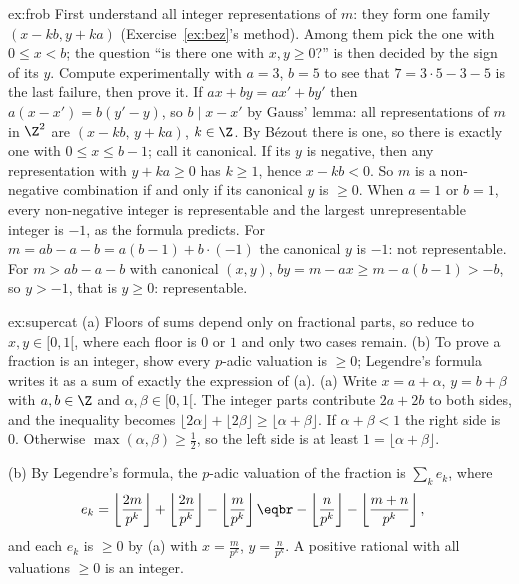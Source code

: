 \begin{solution}{ex:frob}
\idea First understand all integer representations of $m$: they form one family $(x-kb,y+ka)$ (Exercise~\ref{ex:bez}'s method). Among them pick the one with $0\le x<b$; the question ``is there one with $x,y\ge0$?'' is then decided by the sign of its $y$. Compute experimentally with $a=3$, $b=5$ to see that $7=3\cdot5-3-5$ is the last failure, then prove it.
\writeup If $ax+by=ax'+by'$ then $a(x-x')=b(y'-y)$, so $b\mid x-x'$ by Gauss' lemma: all representations of $m$ in $\Z^2$ are $(x-kb,\,y+ka)$, $k\in\Z$. By B\'ezout there is one, so there is exactly one with $0\le x\le b-1$; call it canonical.
If its $y$ is negative, then any representation with $y+ka\ge0$ has $k\ge1$, hence $x-kb<0$. So $m$ is a non-negative combination if and only if its canonical $y$ is $\ge0$.
When $a=1$ or $b=1$, every non-negative integer is representable and the largest unrepresentable integer is $-1$, as the formula predicts. For $m=ab-a-b=a(b-1)+b\cdot(-1)$ the canonical $y$ is $-1$: not representable. For $m>ab-a-b$ with canonical $(x,y)$, $by=m-ax\ge m-a(b-1)>-b$, so $y>-1$, that is $y\ge0$: representable.
\end{solution}

\begin{solution}{ex:supercat}
\idea (a) Floors of sums depend only on fractional parts, so reduce to $x,y\in[0,1[$, where each floor is $0$ or $1$ and only two cases remain. (b) To prove a fraction is an integer, show every $p$-adic valuation is $\ge0$; Legendre's formula writes it as a sum of exactly the expression of (a).
\writeup (a) Write $x=a+\alpha$, $y=b+\beta$ with $a,b\in\Z$ and $\alpha,\beta\in[0,1[$. The integer parts contribute $2a+2b$ to both sides, and the inequality becomes $\lfloor2\alpha\rfloor+\lfloor2\beta\rfloor\ge\lfloor\alpha+\beta\rfloor$. If $\alpha+\beta<1$ the right side is $0$. Otherwise $\max(\alpha,\beta)\ge\frac12$, so the left side is at least $1=\lfloor\alpha+\beta\rfloor$.

(b) By Legendre's formula, the $p$-adic valuation of the fraction is $\sum_ke_k$, where
\[\begin{aligned}e_k&=\left\lfloor\frac{2m}{p^k}\right\rfloor+\left\lfloor\frac{2n}{p^k}\right\rfloor-\left\lfloor\frac m{p^k}\right\rfloor\eqbr-\left\lfloor\frac n{p^k}\right\rfloor-\left\lfloor\frac{m+n}{p^k}\right\rfloor,\end{aligned}\]
and each $e_k$ is $\ge0$ by (a) with $x=\frac m{p^k}$, $y=\frac n{p^k}$. A positive rational with all valuations $\ge0$ is an integer.
\end{solution}

